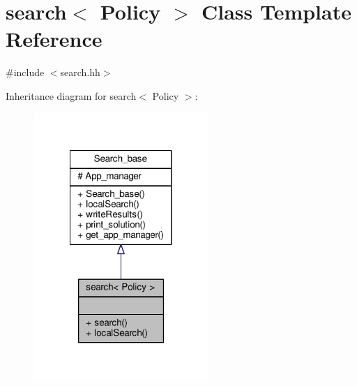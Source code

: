 \hypertarget{classsearch}{\section{search$<$ Policy $>$ Class Template Reference}
\label{classsearch}
}


{\ttfamily \#include $<$search.\-hh$>$}



Inheritance diagram for search$<$ Policy $>$\-:\nopagebreak
\begin{figure}[H]
\begin{center}
\leavevmode
\includegraphics[width=188pt]{classsearch__inherit__graph}
\end{center}
\end{figure}


